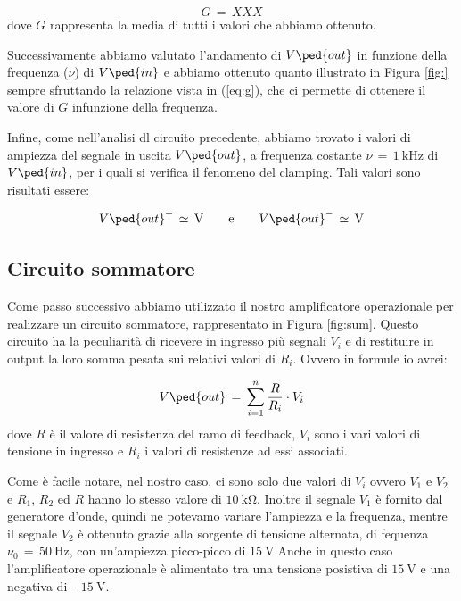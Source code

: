 \begin{equation}
        G\,=\, XXX
\end{equation}
%
dove $G$ rappresenta la media di tutti i valori che abbiamo ottenuto.

Successivamente abbiamo valutato l'andamento di $V\ped{out}$ in funzione della frequenza ($\nu$) di $V\ped{in}$ e abbiamo ottenuto quanto illustrato in Figura \ref{fig:} sempre sfruttando la relazione vista in (\ref{eq:g}), che ci permette di ottenere il valore di $G$ infunzione della frequenza.

Infine, come nell'analisi dl circuito precedente, abbiamo trovato i valori di ampiezza del segnale in uscita $V\ped{out}$, a frequenza costante $\nu\,=\,\SI{1}{\kilo\hertz}$ di $V\ped{in}$, per i quali si verifica il fenomeno del clamping. Tali valori sono risultati essere:

\begin{equation}
        V\ped{out}^+\,\simeq\,\SI{}{\volt} \qquad \text{e} \qquad V\ped{out}^-\,\simeq\,\SI{}{\volt}
\end{equation}

\subsection*{Circuito sommatore}

Come passo successivo abbiamo utilizzato il nostro amplificatore operazionale per realizzare un circuito sommatore, rappresentato in Figura \ref{fig:sum}. Questo circuito ha la peculiarità di ricevere in ingresso più segnali $V_i$ e di restituire in output la loro somma pesata sui relativi valori di $R_i$. Ovvero in formule io avrei:

\begin{equation}
        V\ped{out}\,=\,\sum_{i=1}^{n}{\frac{R}{R_i} \cdot V_i}
\end{equation}
%
dove $R$ è il valore di resistenza del ramo di feedback, $V_i$ sono i vari valori di tensione in ingresso e $R_i$ i valori di resistenze ad essi associati.

Come è facile notare, nel nostro caso, ci sono solo due valori di $V_i$ ovvero $V_1$ e $V_2$ e $R_1$, $R_2$ ed $R$ hanno lo stesso valore di $\SI{10}{\kilo\ohm}$. Inoltre il segnale $V_1$ è fornito dal generatore d'onde, quindi ne potevamo variare l'ampiezza e la frequenza, mentre il segnale $V_2$ è ottenuto grazie alla sorgente di tensione alternata, di fequenza $\nu_0\,=\,\SI{50}{\hertz}$, con un'ampiezza picco-picco di $\SI{15}{\volt}$.Anche in questo caso l'amplificatore operazionale è alimentato tra una tensione posistiva di $\SI{+15}{\volt}$ e una negativa di $\SI{-15}{\volt}$.

